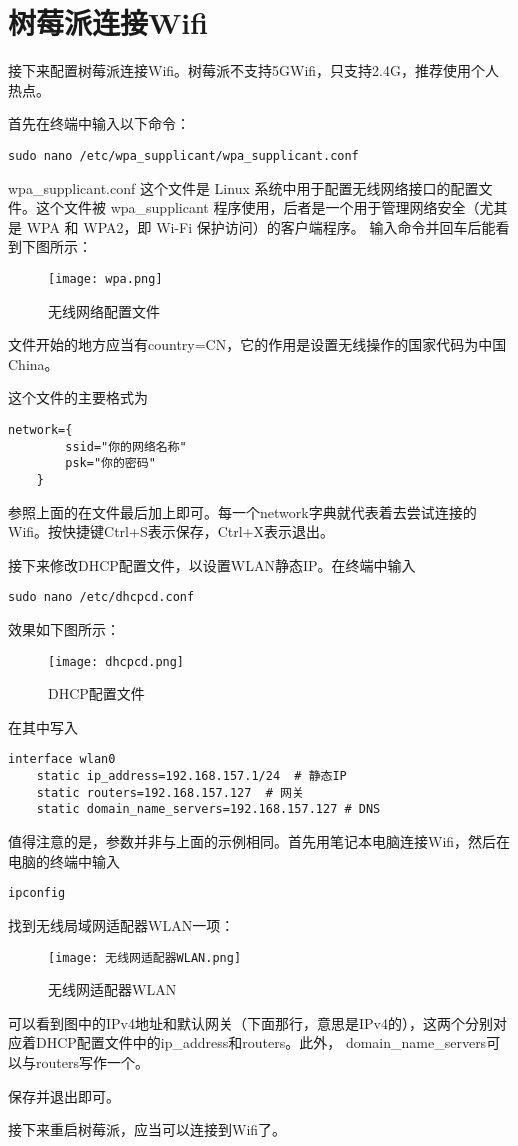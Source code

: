 \section{树莓派连接Wifi}
接下来配置树莓派连接Wifi。树莓派不支持5GWifi，只支持2.4G，推荐使用个人热点。
\par
首先在终端中输入以下命令：
\begin{lstlisting}[style=bashstyle]
sudo nano /etc/wpa_supplicant/wpa_supplicant.conf
\end{lstlisting}
\par
wpa\_supplicant.conf 这个文件是 Linux 系统中用于配置无线网络接口的配置文件。这个文件被 wpa\_supplicant 程序使用，后者是一个用于管理网络安全（尤其是 WPA 和 WPA2，即 Wi-Fi 保护访问）的客户端程序。
输入命令并回车后能看到下图所示：
\begin{figure}[H]
	\centering
	\texttt{[image: wpa.png]}
	\caption{无线网络配置文件}
	\label{fig:example}
\end{figure}
文件开始的地方应当有country=CN，它的作用是设置无线操作的国家代码为中国China。
\par
这个文件的主要格式为
\begin{lstlisting}[style=bashstyle]
	network={
		ssid="你的网络名称"
		psk="你的密码"
	}
\end{lstlisting}
\par
参照上面的在文件最后加上即可。每一个network字典就代表着去尝试连接的Wifi。按快捷键Ctrl+S表示保存，Ctrl+X表示退出。
\par
接下来修改DHCP配置文件，以设置WLAN静态IP。在终端中输入
\begin{lstlisting}[style=bashstyle]
	sudo nano /etc/dhcpcd.conf
\end{lstlisting}
效果如下图所示：
\begin{figure}[H]
	\centering
	\texttt{[image: dhcpcd.png]}
	\caption{DHCP配置文件}
	\label{fig:example}
\end{figure}
\par
在其中写入
\begin{lstlisting}[style=configstyle]
	interface wlan0
	static ip_address=192.168.157.1/24	# 静态IP
	static routers=192.168.157.127	# 网关
	static domain_name_servers=192.168.157.127 # DNS
\end{lstlisting}
值得注意的是，参数并非与上面的示例相同。首先用笔记本电脑连接Wifi，然后在电脑的终端中输入
\begin{lstlisting}[style=bashstyle]
	ipconfig
\end{lstlisting}
\par
找到无线局域网适配器WLAN一项：
\begin{figure}[H]
	\centering
	\texttt{[image: 无线网适配器WLAN.png]}
	\caption{无线网适配器WLAN}
	\label{fig:example}
\end{figure}
可以看到图中的IPv4地址和默认网关（下面那行，意思是IPv4的），这两个分别对应着DHCP配置文件中的ip\_address和routers。此外， domain\_name\_servers可以与routers写作一个。
\par
保存并退出即可。
\par
接下来重启树莓派，应当可以连接到Wifi了。


